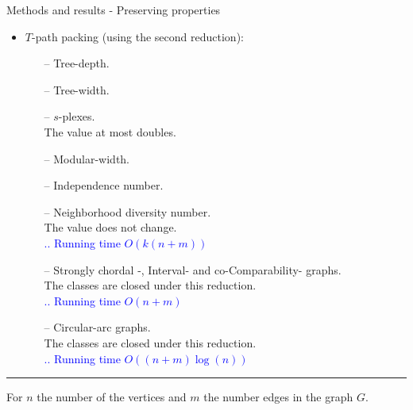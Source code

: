 \documentclass{beamer}
\begin{document}
\begin{frame}[t]{Methods and results - Preserving properties}
\vspace{.5cm}
	\begin{itemize}
		\item $T$-path packing (using the second reduction):
		\begin{itemize}
			\item[--] Tree-depth.
			\item[--] Tree-width.
			\item[--] $s$-plexes.\\ \hspace{.5cm} The value at most doubles.
			\item[--] Modular-width.
			\item[--] Independence number.
			\item[--] Neighborhood diversity number.\\ \hspace{.5cm} The value does not change.\\
				\hspace{5cm} \textcolor{blue}{ .. Running time $O(k(n+m))$}
			\item[--] Strongly chordal -, Interval- and co-Comparability- graphs.\\
				\hspace{.5cm} The classes are closed under this reduction.\\
				\hspace{5cm} \textcolor{blue}{ .. Running time $O(n+m)$}
			\item[--] Circular-arc graphs.\\
				\hspace{.5cm} The classes are closed under this reduction.\\
				\hspace{5cm} \textcolor{blue}{ .. Running time $O((n+m)\log(n))$}
		\end{itemize}
	\end{itemize}
	\hrule
	{\tiny For $n$ the number of the vertices and $m$ the number edges in the graph $G$.}
\end{frame}
\end{document}
